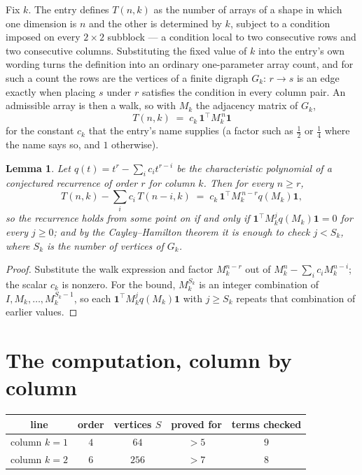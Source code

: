 \documentclass[11pt,a4paper]{article}
\theoremstyle{plain}
\newtheorem{lemma}[theorem]{Lemma}
\theoremstyle{definition}
\begin{document}
Fix $k$. The entry defines $T(n,k)$ as the number of arrays of a shape in which one dimension
is $n$ and the other is determined by $k$, subject to a condition imposed on every
$2\times2$ subblock --- a condition local to two consecutive rows and two consecutive columns.
Substituting the fixed value of $k$ into the entry's own wording turns the definition into an
ordinary one-parameter array count, and for such a count the rows are the vertices of a finite
digraph $G_k$: $r\to s$ is an edge exactly when placing $s$ under $r$ satisfies the condition
in every column pair. An admissible array is then a walk, so with $M_k$ the adjacency matrix
of $G_k$,
\[
T(n,k)\;=\;c_k\,\mathbf{1}^{\!\top}M_k^{\,n}\mathbf{1}
\]
for the constant $c_k$ that the entry's name supplies (a factor such as $\tfrac12$ or
$\tfrac14$ where the name says so, and $1$ otherwise).

\begin{lemma}\label{lem:crit}
Let $q(t)=t^{r}-\sum_i c_it^{r-i}$ be the characteristic polynomial of a conjectured
recurrence of order $r$ for column $k$. Then for every $n\ge r$,
\[
T(n,k)-\sum_i c_i\,T(n-i,k)\;=\;c_k\,\mathbf{1}^{\!\top}M_k^{\,n-r}q(M_k)\mathbf{1},
\]
so the recurrence holds from some point on if and only if
$\mathbf{1}^{\!\top}M_k^{j}q(M_k)\mathbf{1}=0$ for every $j\ge0$; and by the
Cayley--Hamilton theorem it is enough to check $j<S_k$, where $S_k$ is the number of vertices
of $G_k$.
\end{lemma}

\begin{proof}
Substitute the walk expression and factor $M_k^{n-r}$ out of $M_k^{n}-\sum_ic_iM_k^{n-i}$;
the scalar $c_k$ is nonzero. For the bound, $M_k^{S_k}$ is an integer combination of
$I,M_k,\dots,M_k^{S_k-1}$, so each $\mathbf{1}^{\!\top}M_k^{j}q(M_k)\mathbf{1}$ with
$j\ge S_k$ repeats that combination of earlier values.
\end{proof}

\section{The computation, column by column}

\begin{center}
\begin{tabular}{ccccc}
line & order & vertices $S$ & proved for & terms checked \\ \hline
column $k$$=1$ & $4$ & $64$ & $>5$ & $9$ \\
column $k$$=2$ & $6$ & $256$ & $>7$ & $8$ \\
\end{tabular}
\end{center}
\end{document}
